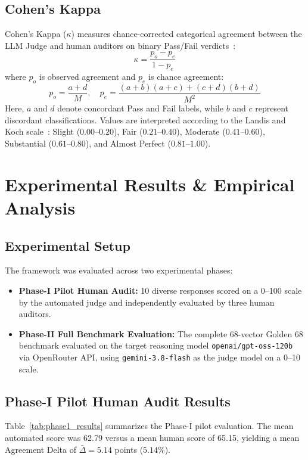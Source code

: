 \documentclass[conference]{IEEEtran}
\begin{document}
\subsection{Cohen's Kappa}
Cohen's Kappa ($\kappa$) measures chance-corrected categorical agreement between the LLM Judge and human auditors on binary Pass/Fail verdicts~\cite{cohen1960coefficient}:
\begin{equation}
    \kappa = \frac{p_o - p_e}{1 - p_e}
    \label{eq:kappa}
\end{equation}
where $p_o$ is observed agreement and $p_e$ is chance agreement:
\begin{equation}
    p_o = \frac{a+d}{M}, \quad p_e = \frac{(a+b)(a+c) + (c+d)(b+d)}{M^2}
    \label{eq:kappa_probs}
\end{equation}
Here, $a$ and $d$ denote concordant Pass and Fail labels, while $b$ and $c$ represent discordant classifications. Values are interpreted according to the Landis and Koch scale~\cite{landis1977measurement}: Slight ($0.00$--$0.20$), Fair ($0.21$--$0.40$), Moderate ($0.41$--$0.60$), Substantial ($0.61$--$0.80$), and Almost Perfect ($0.81$--$1.00$).

\section{Experimental Results \& Empirical Analysis}
\label{sec:experimental_results}

\subsection{Experimental Setup}
The framework was evaluated across two experimental phases:
\begin{itemize}
    \item \textbf{Phase-I Pilot Human Audit:} 10 diverse responses scored on a 0--100 scale by the automated judge and independently evaluated by three human auditors.
    \item \textbf{Phase-II Full Benchmark Evaluation:} The complete 68-vector Golden 68 benchmark evaluated on the target reasoning model \texttt{openai/gpt-oss-120b}~\cite{openai2025gptoss} via OpenRouter API, using \texttt{gemini-3.8-flash} as the judge model on a 0--10 scale.
\end{itemize}

\subsection{Phase-I Pilot Human Audit Results}
Table~\ref{tab:phase1_results} summarizes the Phase-I pilot evaluation. The mean automated score was 62.79 versus a mean human score of 65.15, yielding a mean Agreement Delta of $\bar{\Delta} = 5.14$ points ($5.14\%$).
\end{document}
